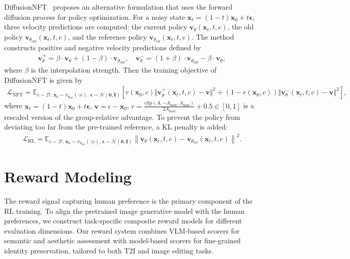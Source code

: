 \documentclass{article} %
\renewcommand{\mathbf}[1]{\bm{#1}}
\begin{document}
DiffusionNFT~\citep{zheng2025diffusionnft} proposes an alternative formulation that uses the forward diffusion process for policy optimization. For a noisy state $\mathbf{x}_t=(1-t)\mathbf{x}_0+t\mathbf{\epsilon}$, three velocity predictions are computed: the current policy $\mathbf{v}_\theta(\mathbf{x}_t, t,c)$, the old policy $\mathbf{v}_{\theta_{\text{old}}}(\mathbf{x}_t, t,c)$, and the reference policy $\mathbf{v}_{\theta_{\text{ref}}}(\mathbf{x}_t, t,c)$. The method constructs positive and negative velocity predictions defined by
\begin{align}
    \mathbf{v}^{+}_\theta = \beta \cdot \mathbf{v}_\theta + (1-\beta) \cdot \mathbf{v}_{\theta_{\text{old}}}, \quad
    \mathbf{v}^{-}_\theta = (1+\beta) \cdot \mathbf{v}_{\theta_{\text{old}}} - \beta \cdot \mathbf{v}_\theta,
\end{align}
where $\beta$ is the interpolation strength. Then the training objective of DiffusionNFT is given by
\begin{align}
    \mathcal{L}_{\text{NFT}} = \mathbb{E}_{c\sim\mathcal{D},\,\mathbf{x}_0 \sim \pi_{\theta_{\text{old}}}(\cdot | c),\, \mathbf{\epsilon}\sim\mathcal{N}(\mathbf{0},\mathbf{I})}\left[r(\mathbf{x}_0, c) \Vert \mathbf{v}^{+}_\theta(\mathbf{x}_t, t,c)-\mathbf{v}\Vert^2+(1-r(\mathbf{x}_0, c)) \Vert \mathbf{v}^{-}_\theta(\mathbf{x}_t, t,c)-\mathbf{v}\Vert^2\right],
    \label{eq:nft-loss}
\end{align}
where $\mathbf{x}_t=(1-t)\mathbf{x}_0+t\mathbf{\epsilon}$, $\mathbf{v}=\epsilon-\mathbf{x}_0$, $r=\frac{\text{clip}(A, -A_{\max}, A_{\max})}{2 A_{\max}} + 0.5\in[0,1]$ is a rescaled version of the group-relative advantage. 
To prevent the policy from deviating too far from the pre-trained reference, a KL penalty is added:
\begin{align}
    \mathcal{L}_{\text{KL}} = \mathbb{E}_{c\sim\mathcal{D},\,\mathbf{x}_0 \sim \pi_{\theta_{\text{old}}}(\cdot | c),\, \mathbf{\epsilon}\sim\mathcal{N}(\mathbf{0},\mathbf{I})}\left\| \mathbf{v}_\theta(\mathbf{x}_t, t,c) - \mathbf{v}_{\theta_{\text{ref}}}(\mathbf{x}_t, t,c) \right\|^2.
\end{align}

\section{Reward Modeling}
\label{sec:reward}
The reward signal capturing human preference is the primary component of the RL training. To align the pretrained image generative model with the human preferences, we construct task-specific composite reward models for different evaluation dimensions. Our reward system combines VLM-based scorers for semantic and aesthetic assessment with model-based scorers for fine-grained identity preservation, tailored to both T2I and image editing tasks.
\end{document}
